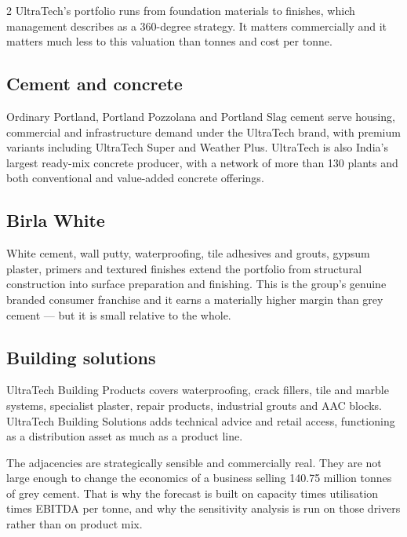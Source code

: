 \begin{paracol}{2}
UltraTech's portfolio runs from foundation materials to finishes, which management
describes as a 360-degree strategy. It matters commercially and it matters much less
to this valuation than tonnes and cost per tonne.

\subsection{Cement and concrete}

Ordinary Portland, Portland Pozzolana and Portland Slag cement serve housing,
commercial and infrastructure demand under the UltraTech brand, with premium variants
including UltraTech Super and Weather Plus. UltraTech is also India's largest
ready-mix concrete producer, with a network of more than 130 plants and both
conventional and value-added concrete offerings.

\subsection{Birla White}

White cement, wall putty, waterproofing, tile adhesives and grouts, gypsum plaster,
primers and textured finishes extend the portfolio from structural construction into
surface preparation and finishing. This is the group's genuine branded consumer
franchise and it earns a materially higher margin than grey cement — but it is small
relative to the whole.

\subsection{Building solutions}

UltraTech Building Products covers waterproofing, crack fillers, tile and marble
systems, specialist plaster, repair products, industrial grouts and AAC blocks.
UltraTech Building Solutions adds technical advice and retail access, functioning as
a distribution asset as much as a product line.

\begin{okbox}
The adjacencies are strategically sensible and commercially real. They are not large
enough to change the economics of a business selling 140.75 million tonnes of grey
cement. That is why the forecast is built on capacity times utilisation times EBITDA
per tonne, and why the sensitivity analysis is run on those drivers rather than on
product mix.
\end{okbox}


\end{paracol}
